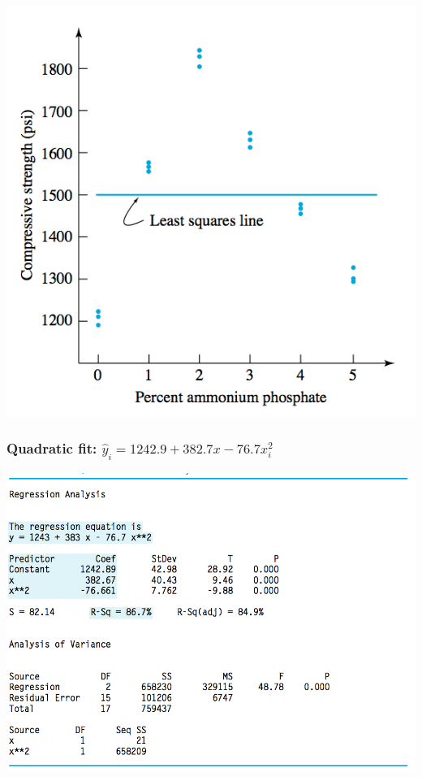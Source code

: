 \documentclass[handout]{beamer}
\providecommand{\wh}[1]{\widehat{#1}}
\numberwithin{equation}{section}
\begin{document}
\begin{frame}
\begin{minipage}[b]{.48\linewidth}
 \includegraphics{../../fig/flyashslrfit2.png}
\end{minipage}
\end{frame}

\begin{frame}
\frametitle{Quadratic fit: $\wh{y}_i = 1242.9 + 382.7x - 76.7x_i^2$}
 \includegraphics{../../fig/flyashquadfitoutput.png}
\end{frame}
\end{document}
